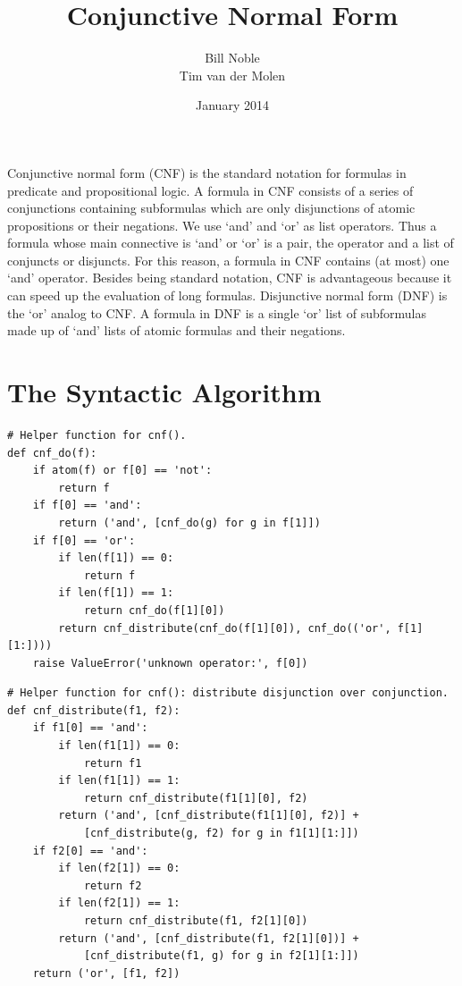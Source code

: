 \documentclass[a4paper,notitlepage]{scrartcl}
\title{Conjunctive Normal Form}
\author{Bill Noble\\ Tim van der Molen}
\date{January 2014}
\begin{document}
\maketitle

Conjunctive normal form (CNF) is the standard notation for formulas in predicate
        and propositional logic.
A formula in CNF consists of a series of conjunctions containing subformulas
        which are only disjunctions of atomic propositions or their negations.
We use `and' and `or' as list operators.
Thus a formula whose main connective is `and' or `or' is a pair, the operator
        and a list of conjuncts or disjuncts.
For this reason, a formula in CNF contains (at most) one `and' operator.
Besides being standard notation, CNF is advantageous because it can speed up the
        evaluation of long formulas.
Disjunctive normal form (DNF) is the `or' analog to CNF. A formula in DNF is
        a single `or' list of subformulas made up of `and' lists of atomic
        formulas and their negations.

\section{The Syntactic Algorithm}
\begin{verbatim}
# Helper function for cnf().
def cnf_do(f):
    if atom(f) or f[0] == 'not':
        return f
    if f[0] == 'and':
        return ('and', [cnf_do(g) for g in f[1]])
    if f[0] == 'or':
        if len(f[1]) == 0:
            return f
        if len(f[1]) == 1:
            return cnf_do(f[1][0])
        return cnf_distribute(cnf_do(f[1][0]), cnf_do(('or', f[1][1:])))
    raise ValueError('unknown operator:', f[0])
\end{verbatim}

\begin{verbatim}
# Helper function for cnf(): distribute disjunction over conjunction.
def cnf_distribute(f1, f2):
    if f1[0] == 'and':
        if len(f1[1]) == 0:
            return f1
        if len(f1[1]) == 1:
            return cnf_distribute(f1[1][0], f2)
        return ('and', [cnf_distribute(f1[1][0], f2)] +
            [cnf_distribute(g, f2) for g in f1[1][1:]])
    if f2[0] == 'and':
        if len(f2[1]) == 0:
            return f2
        if len(f2[1]) == 1:
            return cnf_distribute(f1, f2[1][0])
        return ('and', [cnf_distribute(f1, f2[1][0])] +
            [cnf_distribute(f1, g) for g in f2[1][1:]])
    return ('or', [f1, f2])
\end{verbatim}
\end{document}
